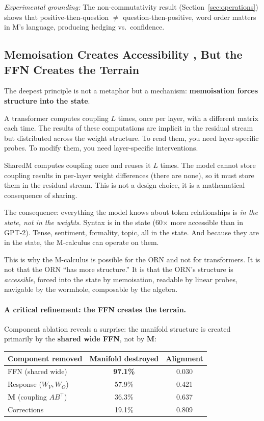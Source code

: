 \documentclass[11pt, a4paper]{article}
\newcommand{\M}{\mathbf{M}}
\theoremstyle{plain}
\theoremstyle{definition}
\theoremstyle{remark}
\begin{document}
\emph{Experimental grounding:}
The non-commutativity result (Section~\ref{sec:operations}) shows that positive-then-question $\neq$ question-then-positive, word order matters in M's language, producing hedging vs.\ confidence.

\subsection{Memoisation Creates Accessibility ,  But the FFN Creates the Terrain}

The deepest principle is not a metaphor but a mechanism: \textbf{memoisation forces structure into the state}.

A transformer computes coupling $L$ times, once per layer, with a different matrix each time.
The results of these computations are implicit in the residual stream but distributed across the weight structure.
To read them, you need layer-specific probes.
To modify them, you need layer-specific interventions.

SharedM computes coupling once and reuses it $L$ times.
The model cannot store coupling results in per-layer weight differences (there are none), so it must store them in the residual stream.
This is not a design choice, it is a mathematical consequence of sharing.

The consequence: everything the model knows about token relationships is \emph{in the state, not in the weights}.
Syntax is in the state (60$\times$ more accessible than in GPT-2).
Tense, sentiment, formality, topic, all in the state.
And because they are in the state, the M-calculus can operate on them.

This is why the M-calculus is possible for the ORN and not for transformers.
It is not that the ORN ``has more structure.''
It is that the ORN's structure is \emph{accessible}, forced into the state by memoisation, readable by linear probes, navigable by the wormhole, composable by the algebra.

\paragraph{A critical refinement: the FFN creates the terrain.}
Component ablation reveals a surprise: the manifold structure is created primarily by the \textbf{shared wide FFN}, not by $\M$:

\begin{center}\small
\begin{tabular}{lcc}
\toprule
\textbf{Component removed} & \textbf{Manifold destroyed} & \textbf{Alignment} \\
\midrule
FFN (shared wide) & \textbf{97.1\%} & 0.030 \\
Response ($W_V, W_O$) & 57.9\% & 0.421 \\
$\M$ (coupling $AB^\top$) & 36.3\% & 0.637 \\
Corrections & 19.1\% & 0.809 \\
\bottomrule
\end{tabular}
\end{center}
\end{document}
